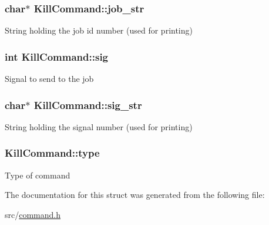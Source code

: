 \subsubsection[{\texorpdfstring{job\+\_\+str}{job_str}}]{\setlength{\rightskip}{0pt plus 5cm}char$\ast$ Kill\+Command\+::job\+\_\+str}\hypertarget{structKillCommand_a174a9714a69550b0bbf611e59bfbf332}{}\label{structKillCommand_a174a9714a69550b0bbf611e59bfbf332}
String holding the job id number (used for printing) 
\subsubsection[{\texorpdfstring{sig}{sig}}]{\setlength{\rightskip}{0pt plus 5cm}int Kill\+Command\+::sig}\hypertarget{structKillCommand_a20f5367bbec80a936189c57b1f9db351}{}\label{structKillCommand_a20f5367bbec80a936189c57b1f9db351}
Signal to send to the job 
\subsubsection[{\texorpdfstring{sig\+\_\+str}{sig_str}}]{\setlength{\rightskip}{0pt plus 5cm}char$\ast$ Kill\+Command\+::sig\+\_\+str}\hypertarget{structKillCommand_a879a36b90427ec640bef5c92a6c9c24e}{}\label{structKillCommand_a879a36b90427ec640bef5c92a6c9c24e}
String holding the signal number (used for printing) 
\subsubsection[{\texorpdfstring{type}{type}}]{ Kill\+Command\+::type}\hypertarget{structKillCommand_a9cd678bc0659f74340e3fca28766bcda}{}\label{structKillCommand_a9cd678bc0659f74340e3fca28766bcda}
Type of command 

The documentation for this struct was generated from the following file\+:\begin{DoxyCompactItemize}
\item 
src/\hyperlink{command_8h}{command.\+h}\end{DoxyCompactItemize}

